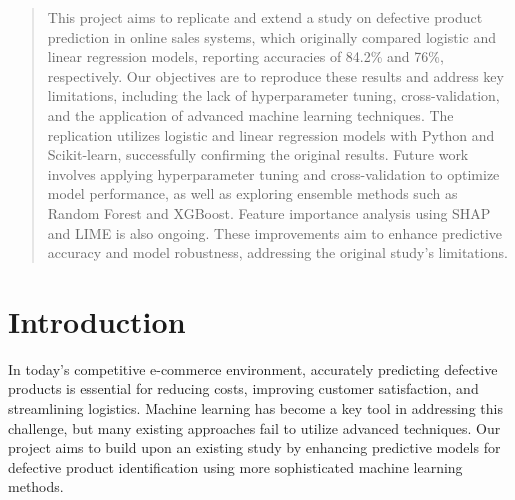 \documentclass[conference]{IEEEtran}
\begin{document}
\maketitle

\begin{abstract}
This project aims to replicate and extend a study on defective product prediction in online sales systems, which originally compared logistic and linear regression models, reporting accuracies of 84.2\% and 76\%, respectively. Our objectives are to reproduce these results and address key limitations, including the lack of hyperparameter tuning, cross-validation, and the application of advanced machine learning techniques.
The replication utilizes logistic and linear regression models with Python and Scikit-learn, successfully confirming the original results. Future work involves applying hyperparameter tuning and cross-validation to optimize model performance, as well as exploring ensemble methods such as Random Forest and XGBoost. Feature importance analysis using SHAP and LIME is also ongoing. These improvements aim to enhance predictive accuracy and model robustness, addressing the original study’s limitations.
\end{abstract}


\section{Introduction}
In today’s competitive e-commerce environment, accurately predicting defective products is essential for reducing costs, improving customer satisfaction, and streamlining logistics. Machine learning has become a key tool in addressing this challenge, but many existing approaches fail to utilize advanced techniques. Our project aims to build upon an existing study by enhancing predictive models for defective product identification using more sophisticated machine learning methods.
\end{document}
